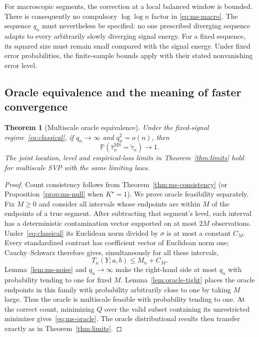 \documentclass[pdflatex,sn-mathphys-num]{sn-jnl}
\newcommand{\Prob}{\mathbb P}
\newcommand{\tol}{\widetilde\tau_n}
\theoremstyle{thmstyleone}
\newtheorem{theorem}{Theorem}
\theoremstyle{thmstyletwo}
\begin{document}
For macroscopic segments, the correction at a local balanced window is
bounded. There is consequently no compulsory $\log\log n$ factor in
\eqref{eq:ms-macro}. The sequence $q_n$ must nevertheless be specified:
no one prescribed diverging sequence adapts to every arbitrarily slowly
diverging signal energy. For a fixed sequence, its squared size must remain
small compared with the signal energy. Under fixed error probabilities,
the finite-sample bounds apply with their stated nonvanishing error level.

\subsection{Oracle equivalence and the meaning of faster convergence}

\begin{theorem}[Multiscale oracle equivalence]\label{thm:ms-oracle}
Under the fixed-signal regime~\eqref{eq:classical}, if
$q_n\to\infty$ and $q_n^2=o(n)$, then
\begin{equation}\label{eq:ms-oracle}
\Prob(\widehat\tau_n^{\mathrm{MS}}=\tol)\longrightarrow1.
\end{equation}
The joint location, level and empirical-loss limits in
Theorem~\ref{thm:limits} hold for multiscale SVP with the same limiting laws.
\end{theorem}
\begin{proof}
Count consistency follows from Theorem~\ref{thm:ms-consistency} (or
Proposition~\ref{prop:ms-null} when $K^\star=1$). We prove oracle feasibility
separately. Fix $M\ge0$ and consider all intervals whose endpoints are
within $M$ of the endpoints of a true segment. After subtracting that
segment's level, each interval has a deterministic contamination vector
supported on at most $2M$ observations. Under~\eqref{eq:classical} its
Euclidean norm divided by $\sigma$ is at most a constant $C_M$.
Every standardized contrast has coefficient vector of Euclidean norm one;
Cauchy--Schwarz therefore gives, simultaneously for all these intervals,
\[
T_n(Y;a,b)\le M_n+C_M.
\]
Lemma~\ref{lem:ms-noise} and $q_n\to\infty$ make the right-hand side at
most $q_n$ with probability tending to one for fixed $M$.
Lemma~\ref{lem:oracle-tight} places the oracle endpoints in this family with
probability arbitrarily close to one by taking $M$ large. Thus the oracle
is multiscale feasible with probability tending to one. At the correct
count, minimizing $Q$ over the valid subset containing its unrestricted
minimizer gives~\eqref{eq:ms-oracle}. The oracle distributional results
then transfer exactly as in Theorem~\ref{thm:limits}.
\end{proof}
\end{document}
